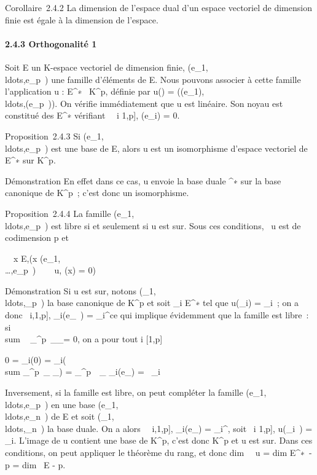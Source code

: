 \documentclass[]{article}
\begin{document}
Corollaire~2.4.2 La dimension de l'espace dual d'un espace vectoriel de
dimension finie est égale à la dimension de l'espace.

\paragraph{2.4.3 Orthogonalité 1}

Soit E un K-espace vectoriel de dimension finie,
(e\_1,\\ldots,e\_p~)
une famille d'éléments de E. Nous pouvons associer à cette famille
l'application u : E^∗\rightarrow~ K^p, définie par u(\phi) =
(\phi(e\_1),\\ldots,\phi(e\_p~)).
On vérifie immédiatement que u est linéaire. Son noyau est constitué des
\phi \in E^∗ vérifiant \forall~~i \in {[}1,p{]},
\phi(e\_i) = 0.

Proposition~2.4.3 Si
(e\_1,\\ldots,e\_p~)
est une base de E, alors u est un isomorphisme d'espace vectoriel de
E^∗ sur K^p.

Démonstration En effet dans ce cas, u envoie la base duale
^∗ sur la base canonique de K^p~; c'est donc un
isomorphisme.

Proposition~2.4.4 La famille
(e\_1,\\ldots,e\_p~)
est libre si et seulement si u est sur\jmathective. Sous ces conditions,
\mathrmKer~u est de
codimension p et

\forall~~x \in E,\quad (x
\in\mathrmVect(e\_1,\\\ldots,e\_p~)
\Leftrightarrow \forall~~\phi
\in\mathrmKer~u, \phi(x) = 0)

Démonstration Si u est sur\jmathective, notons
(\epsilon\_1,\\ldots,\epsilon\_p~)
la base canonique de K^p et soit \phi\_i \in
E^∗ tel que u(\phi\_i) = \epsilon\_i~; on a donc
\forall~i,\jmath \in {[}1,p{]}, \phi\_i(e\_\jmath~) =
\delta\_i^\jmath ce qui implique évidemment que la famille est
libre~: si \\sum ~
\_^p\lambda~\_\jmathe\_\jmath = 0, on a pour tout i \in
{[}1,p{]}

0 = \phi\_i(0) = \phi\_i(\\sum
\_^p\lambda~\_ \jmathe\_\jmath) =
\sum \_^p\lambda~~\_
\jmath\phi\_i(e\_\jmath) = \lambda~\_i

Inversement, si la famille est libre, on peut compléter la famille
(e\_1,\\ldots,e\_p~)
en une base
(e\_1,\\ldots,e\_n~)
de E et soit
(\phi\_1,\\ldots,\phi\_n~)
la base duale. On a alors \forall~~i,\jmath \in {[}1,p{]},
\phi\_i(e\_\jmath) = \delta\_i^\jmath, soit
\forall~i \in {[}1,p{]}, u(\phi\_i~) =
\epsilon\_i. L'image de u contient une base de K^p, c'est
donc K^p et u est sur\jmathective. Dans ces conditions, on peut
appliquer le théorème du rang, et donc dim~
\mathrmKer~u
= dim E^∗~- p
= dim~ E - p.
\end{document}
